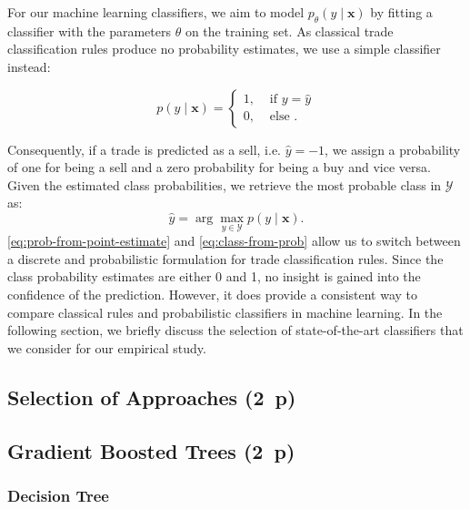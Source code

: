 For our machine learning classifiers, we aim to model $p_{\theta}(y \mid \boldsymbol{x})$ by fitting a classifier with the parameters $\theta$ on the training set. As classical trade classification rules produce no probability estimates, we use a simple classifier instead:

\begin{equation}
    p(y\mid \boldsymbol{x})= \begin{cases}1, & \text { if } y=\hat{y} \\ 0, & \text { else }.\end{cases}
    \label{eq:prob-from-point-estimate}
\end{equation}

Consequently, if a trade is predicted as a sell, i.e. $\hat{y} = -1$,  we assign a probability of one for being a sell and a zero probability for being a buy and vice versa. Given the estimated class probabilities, we retrieve the most probable class in $\mathcal{Y}$ as:
\begin{equation}
    \hat{y}=\arg\max_{y \in \mathcal{Y}} p(y \mid \boldsymbol{x}).
    \label{eq:class-from-prob}
\end{equation}
\cref{eq:prob-from-point-estimate} and \cref{eq:class-from-prob} allow us to switch between a discrete and probabilistic formulation for trade classification rules. Since the class probability estimates are either 0
and 1, no insight is gained into the confidence of the prediction. However, it does provide a consistent way to compare classical rules and probabilistic classifiers in machine learning. In the following section, we briefly discuss the selection of state-of-the-art classifiers that we consider for our empirical study.


\subsection{Selection of Approaches (2~p)}\label{sec:selection-of-approaches}

\subsection{Gradient Boosted Trees (2~p)}\label{sec:gradient-boosted-trees}

\subsubsection{Decision Tree}\label{sec:decision-tree}

